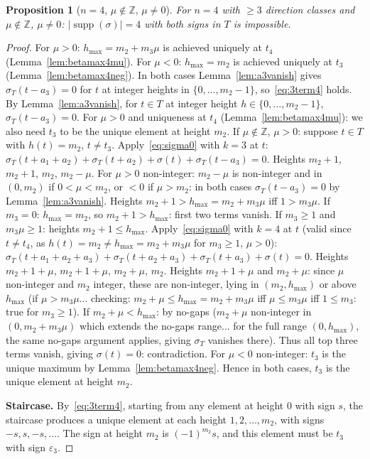 \documentclass{article}
\newtheorem{prop}{Proposition}
\begin{document}
\begin{prop}[$n=4$, $\mu\notin\mathbb{Z}$, $\mu\ne 0$]\label{prop:n4mu}
For $n=4$ with $\ge 3$ direction classes and $\mu\notin\mathbb{Z}$, $\mu\ne 0$:
$|\operatorname{supp}(\sigma)|=4$ with both signs in $T$ is impossible.
\end{prop}
\begin{proof}
For $\mu>0$: $h_{\max}=m_2+m_3\mu$ is achieved uniquely at $t_4$ (Lemma~\ref{lem:betamax4mu}).
For $\mu<0$: $h_{\max}=m_2$ is achieved uniquely at $t_3$ (Lemma~\ref{lem:betamax4neg}).
In both cases Lemma~\ref{lem:a3vanish} gives $\sigma_T(t-a_3)=0$ for $t$ at integer heights in $\{0,\dots,m_2-1\}$,
so~\eqref{eq:3term4} holds.
By Lemma~\ref{lem:a3vanish}, for $t\in T$ at integer height $h\in\{0,\dots,m_2-1\}$, $\sigma_T(t-a_3)=0$.
For $\mu>0$ and uniqueness at $t_4$ (Lemma~\ref{lem:betamax4mu}): we also need $t_3$ to be the unique element at height $m_2$.
If $\mu\notin\mathbb{Z}$, $\mu>0$: suppose $t\in T$ with $h(t)=m_2$, $t\ne t_3$.
Apply~\eqref{eq:sigma0} with $k=3$ at $t$: $\sigma_T(t+a_1+a_2)+\sigma_T(t+a_2)+\sigma(t)+\sigma_T(t-a_3)=0$.
Heights $m_2+1$, $m_2+1$, $m_2$, $m_2-\mu$.
For $\mu>0$ non-integer: $m_2-\mu$ is non-integer and in $(0,m_2)$ if $0<\mu<m_2$,
or $<0$ if $\mu>m_2$: in both cases $\sigma_T(t-a_3)=0$ by Lemma~\ref{lem:a3vanish}.
Heights $m_2+1>h_{\max}=m_2+m_3\mu$ iff $1>m_3\mu$. If $m_3=0$: $h_{\max}=m_2$, so $m_2+1>h_{\max}$: first two terms vanish.
If $m_3\ge 1$ and $m_3\mu\ge 1$: heights $m_2+1\le h_{\max}$.
Apply~\eqref{eq:sigma0} with $k=4$ at $t$ (valid since $t\ne t_4$, as $h(t)=m_2\ne h_{\max}=m_2+m_3\mu$ for $m_3\ge 1$, $\mu>0$):
$\sigma_T(t+a_1+a_2+a_3)+\sigma_T(t+a_2+a_3)+\sigma_T(t+a_3)+\sigma(t)=0$.
Heights $m_2+1+\mu$, $m_2+1+\mu$, $m_2+\mu$, $m_2$.
Heights $m_2+1+\mu$ and $m_2+\mu$: since $\mu$ non-integer and $m_2$ integer, these are non-integer,
lying in $(m_2,h_{\max})$ or above $h_{\max}$ (if $\mu>m_3\mu$... checking: $m_2+\mu\le h_{\max}=m_2+m_3\mu$ iff $\mu\le m_3\mu$ iff $1\le m_3$: true for $m_3\ge 1$).
If $m_2+\mu<h_{\max}$: by no-gaps ($m_2+\mu$ non-integer in $(0,m_2+m_3\mu)$ which extends the no-gaps range... for the full range $(0,h_{\max})$, the same no-gaps argument applies, giving $\sigma_T$ vanishes there).
Thus all top three terms vanish, giving $\sigma(t)=0$: contradiction.
For $\mu<0$ non-integer: $t_3$ is the unique maximum by Lemma~\ref{lem:betamax4neg}.
Hence in both cases, $t_3$ is the unique element at height $m_2$.

\textbf{Staircase.} By~\eqref{eq:3term4}, starting from any element at height $0$ with sign $s$,
the staircase produces a unique element at each height $1,2,\dots,m_2$, with signs $-s, s,-s,\dots$.
The sign at height $m_2$ is $(-1)^{m_2}s$, and this element must be $t_3$ with sign $\varepsilon_3$.


\end{proof}
\end{document}
